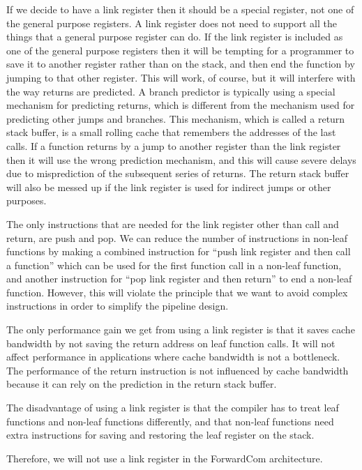 \documentclass[forwardcom.tex]{subfiles}
\begin{document}
If we decide to have a link register then it should be a special register, not one of the general purpose registers. A link register does not need to support all the things that a general purpose register can do. If the link register is included as one of the general purpose registers then it will be tempting for a programmer to save it to another register rather than on the stack, and then end the function by jumping to that other register. This will work, of course, but it will interfere with the way returns are predicted. A branch predictor is typically using a special mechanism for predicting returns, which is different from the mechanism used for predicting other jumps and branches. This mechanism, which is called a return stack buffer, is a small rolling cache that remembers the addresses of the last calls. If a function returns by a jump to another register than the link register then it will use the wrong prediction mechanism, and this will cause severe delays due to misprediction of the subsequent series of returns. The return stack buffer will also be messed up if the link register is used for indirect jumps or other purposes.
\vv

The only instructions that are needed for the link register other than call and return, are push and pop. We can reduce the number of instructions in non-leaf functions by making a combined instruction for ``push link register and then call a function'' which can be used for the first function call in a non-leaf function, and another instruction for ``pop link register and then return'' to end a non-leaf function. However, this will violate the principle that we want to avoid complex instructions in order to simplify the pipeline design.
\vv

The only performance gain we get from using a link register is that it saves cache bandwidth by not saving the return address on leaf function calls. It will not affect performance in applications where cache bandwidth is not a bottleneck. The performance of the return instruction is not influenced by cache bandwidth because it can rely on the prediction in the return stack buffer.
\vv

The disadvantage of using a link register is that the compiler has to treat leaf functions and non-leaf functions differently, and that non-leaf functions need extra instructions for saving and restoring the leaf register on the stack.
\vv

Therefore, we will not use a link register in the ForwardCom architecture.
\end{document}
